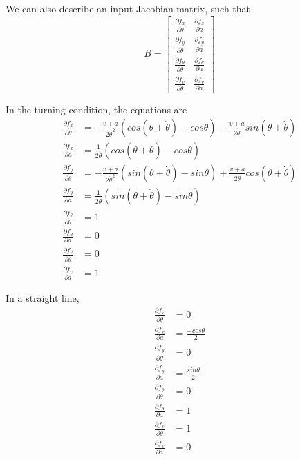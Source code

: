 \documentclass[11pt]{article}
\begin{document}
We can also describe an input Jacobian matrix, such that
\begin{equation}
B = \begin{bmatrix}
\frac{\partial f_x}{\partial \dot{\theta}} & \frac{\partial f_x}{\partial a} \\
\frac{\partial f_y}{\partial \dot{\theta}} & \frac{\partial f_y}{\partial a} \\
\frac{\partial f_\theta}{\partial \dot{\theta}} & \frac{\partial f_\theta}{\partial a} \\
\frac{\partial f_v}{\partial \dot{\theta}} & \frac{\partial f_v}{\partial a}
\end{bmatrix}
\end{equation}

In the turning condition, the equations are
\begin{align}
\frac{\partial f_x}{\partial \dot{\theta}} & = -\frac{v+a}{2 \dot{\theta}^2} (cos(\theta + \dot{\theta}) - cos\theta) - \frac{v+a}{2 \dot{\theta}} sin(\theta + \dot{\theta}) \\
\frac{\partial f_x}{\partial a} & = \frac{1}{2 \dot{\theta}} (cos(\theta + \dot{\theta}) - cos\theta) \\
\frac{\partial f_y}{\partial \dot{\theta}} & = -\frac{v+a}{2 \dot{\theta}^2} (sin(\theta + \dot{\theta}) - sin\theta) + \frac{v+a}{2 \dot{\theta}} cos(\theta + \dot{\theta}) \\
\frac{\partial f_y}{\partial a} & = \frac{1}{2 \dot{\theta}} (sin(\theta + \dot{\theta}) - sin\theta) \\
\frac{\partial f_{\theta}}{\partial \dot{\theta}} & = 1 \\
\frac{\partial f_{\theta}}{\partial a} & = 0 \\
\frac{\partial f_v}{\partial \dot{\theta}} & = 0 \\
\frac{\partial f_v}{\partial a} & = 1 
\end{align}

In a straight line,
\begin{align}
\frac{\partial f_x}{\partial \dot{\theta}} & = 0 \\
\frac{\partial f_x}{\partial a} & = \frac{-cos\theta}{2} \\
\frac{\partial f_y}{\partial \dot{\theta}} & = 0 \\
\frac{\partial f_y}{\partial a} & = \frac{sin\theta}{2} \\
\frac{\partial f_{\theta}}{\partial \dot{\theta}} & = 0 \\
\frac{\partial f_{\theta}}{\partial a} & = 1 \\
\frac{\partial f_v}{\partial \dot{\theta}} & = 1 \\
\frac{\partial f_v}{\partial a} & = 0 
\end{align}
\end{document}
